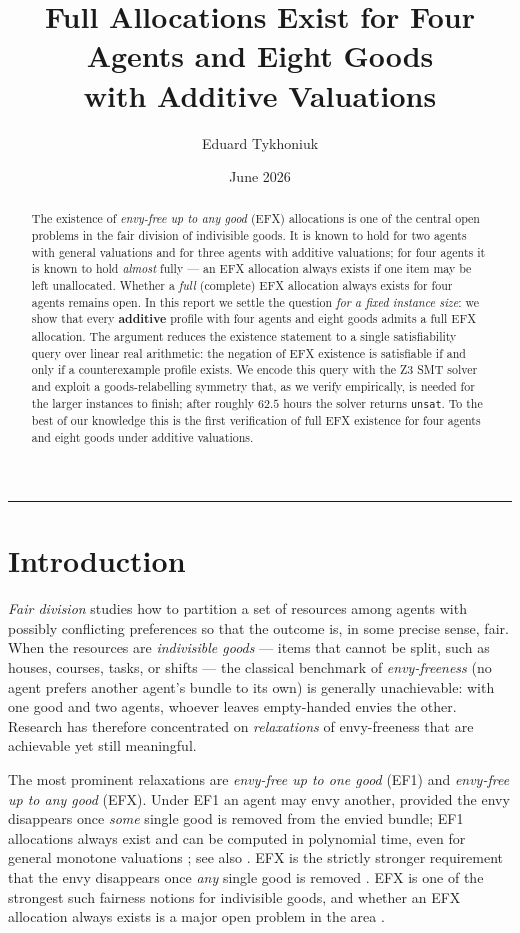 \documentclass[11pt,a4paper]{article}
\title{\textbf{Full \EFX{} Allocations Exist for Four Agents and Eight Goods\\
with Additive Valuations}}
\author{Eduard Tykhoniuk}
\date{June 2026}
\theoremstyle{definition}
\theoremstyle{plain}
\newcommand{\EFX}{\textsf{EFX}}
\newcommand{\EFone}{\textsf{EF1}}
\begin{document}
\maketitle

\begin{abstract}
The existence of \emph{envy-free up to any good} (\EFX) allocations is one of the
central open problems in the fair division of indivisible goods. It is known to
hold for two agents with general valuations and for three agents with additive
valuations; for four agents it is known to hold
\emph{almost} fully --- an \EFX{} allocation always exists if one item may be
left unallocated. Whether a \emph{full} (complete) \EFX{} allocation always
exists for four agents remains open. In this report we settle the question
\emph{for a fixed instance size}: we show that every \textbf{additive} profile
with four agents and eight goods admits a full \EFX{} allocation. The argument
reduces the existence statement to a single satisfiability query over linear real
arithmetic: the negation of \EFX{} existence is satisfiable if and only if a
counterexample profile exists. We encode this query with the Z3 SMT solver and
exploit a goods-relabelling symmetry that, as we verify empirically, is needed for
the larger instances to finish; after roughly $62.5$ hours the solver returns
\texttt{unsat}.
To the best of our knowledge this is the first verification of full \EFX{}
existence for four agents and eight goods under additive valuations.
\end{abstract}

\tableofcontents
\medskip
\hrule

\section{Introduction}
\label{sec:intro}

\emph{Fair division} studies how to partition a set of resources among agents
with possibly conflicting preferences so that the outcome is, in some precise
sense, fair. When the resources are \emph{indivisible goods} --- items that
cannot be split, such as houses, courses, tasks, or shifts --- the classical
benchmark of \emph{envy-freeness} (no agent prefers another agent's bundle to
its own) is generally unachievable: with one good and two agents, whoever leaves
empty-handed envies the other. Research has therefore concentrated on
\emph{relaxations} of envy-freeness that are achievable yet still meaningful.

The most prominent relaxations are \emph{envy-free up to one good} (\EFone) and
\emph{envy-free up to any good} (\EFX). Under \EFone{} an agent may envy another,
provided the envy disappears once \emph{some} single good is removed from the
envied bundle; \EFone{} allocations always exist and can be computed in
polynomial time, even for general monotone valuations
\cite{LiptonEtAl2004}; see also \cite{Budish2011}. \EFX{} is the strictly stronger requirement
that the envy disappears once \emph{any} single good is removed
\cite{Caragiannis2019,PlautRoughgarden2020}. \EFX{} is one of the strongest such
fairness notions for indivisible goods, and whether an \EFX{} allocation always
exists is a major open problem in the area \cite{AmanatidisSurvey2023}.
\end{document}
